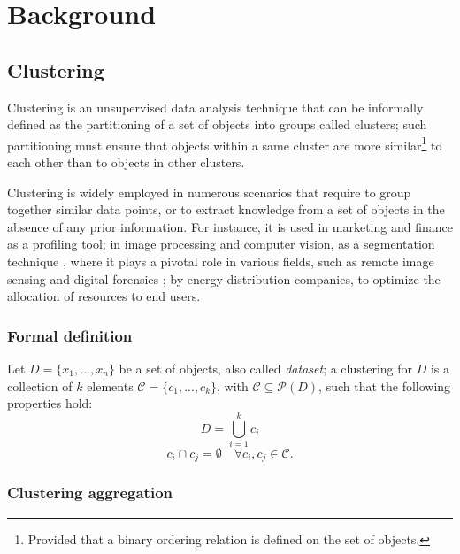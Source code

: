 \chapter{Background}
\label{cha:background}

\section{Clustering}
Clustering is an unsupervised data analysis technique that can be informally defined as the partitioning of a set of objects into groups called clusters; such partitioning must ensure that objects within a same cluster are more similar\footnote{Provided that a binary ordering relation is defined on the set of objects.} to each other than to objects in other clusters. \cite{clustering}

Clustering is widely employed in numerous scenarios that require to group together similar data points, or to extract knowledge from a set of objects in the absence of any prior information. For instance, it is used in marketing and finance as a profiling tool; %
in image processing and computer vision, as a segmentation technique \cite{Gonzalez2017}, where it plays a pivotal role in various fields, such as remote image sensing \cite{remote-sensing} and digital forensics \cite{forensics}; %
by energy distribution companies, to optimize the allocation of resources to end users. %

\subsection{Formal definition}
Let $D = \{x_{1},...,x_{n}\}$ be a set of objects, also called \textit{dataset}; a clustering for $D$ is a collection of $k$ elements $\mathcal{C} =\{c_{1},...,c_{k}\}$, with $\mathcal{C} \subseteq \mathcal{P}(D)$, such that the following properties hold:
\begin{equation}
    \label{eqn:union}
    D = \bigcup_{i=1}^{k} c_{i}
\end{equation}
\begin{equation}
    \label{eqn:overlap}
    c_{i} \cap c_{j} = \emptyset \quad \forall c_{i}, c_{j} \in \mathcal{C}.
\end{equation}

\subsection{Clustering aggregation}


